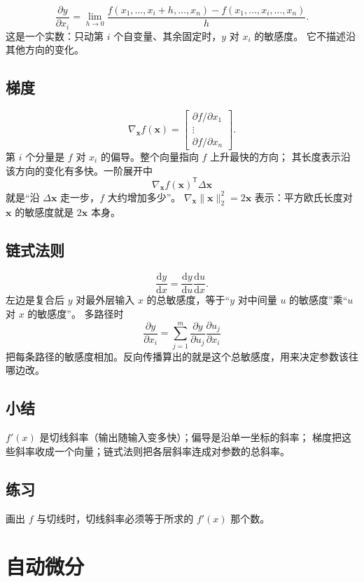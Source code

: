 \[
\frac{\partial y}{\partial x_i}
=
\lim_{h\to 0}
\frac{
f(x_1,\ldots,x_i+h,\ldots,x_n)
-f(x_1,\ldots,x_i,\ldots,x_n)
}{h}.
\]
这是一个实数：只动第 $i$ 个自变量、其余固定时，$y$ 对 $x_i$ 的敏感度。
它不描述沿其他方向的变化。

\subsection{梯度}

\[
\nabla_{\bm{x}}f(\bm{x})
=
\begin{bmatrix}
\partial f/\partial x_1\\
\vdots\\
\partial f/\partial x_n
\end{bmatrix}.
\]
第 $i$ 个分量是 $f$ 对 $x_i$ 的偏导。整个向量指向 $f$ 上升最快的方向；
其长度表示沿该方向的变化有多快。一阶展开中
\[
\nabla_{\bm{x}}f(\bm{x})^{\mathsf T}\Delta\bm{x}
\]
就是“沿 $\Delta\bm{x}$ 走一步，$f$ 大约增加多少”。
$\nabla_{\bm{x}}\|\bm{x}\|_2^2=2\bm{x}$ 表示：平方欧氏长度对 $\bm{x}$ 的敏感度就是 $2\bm{x}$ 本身。

\subsection{链式法则}

\[
\frac{\mathrm{d}y}{\mathrm{d}x}
=
\frac{\mathrm{d}y}{\mathrm{d}u}
\frac{\mathrm{d}u}{\mathrm{d}x}.
\]
左边是复合后 $y$ 对最外层输入 $x$ 的总敏感度，等于“$y$ 对中间量 $u$ 的敏感度”乘“$u$ 对 $x$ 的敏感度”。
多路径时
\[
\frac{\partial y}{\partial x_i}
=
\sum_{j=1}^{m}
\frac{\partial y}{\partial u_j}
\frac{\partial u_j}{\partial x_i}
\]
把每条路径的敏感度相加。反向传播算出的就是这个总敏感度，用来决定参数该往哪边改。

\subsection{小结}

$f'(x)$ 是切线斜率（输出随输入变多快）；偏导是沿单一坐标的斜率；
梯度把这些斜率收成一个向量；链式法则把各层斜率连成对参数的总斜率。

\subsection{练习}

画出 $f$ 与切线时，切线斜率必须等于所求的 $f'(x)$ 那个数。

\section{自动微分}

